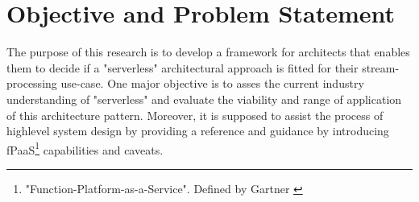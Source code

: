\section{Objective and Problem Statement}

The purpose of this research is to develop a framework for architects that enables them to decide if a "serverless" architectural approach is fitted for their stream-processing use-case.
One major objective is to asses the current industry understanding of "serverless" and evaluate the viability and range of application of this architecture pattern.
Moreover, it is supposed to assist the process of highlevel system design by providing a reference and guidance by introducing fPaaS\footnote{"Function-Platform-as-a-Service". Defined by Gartner \cite{Chandrasekaran2017EvolutionWhen}} capabilities and caveats. 

